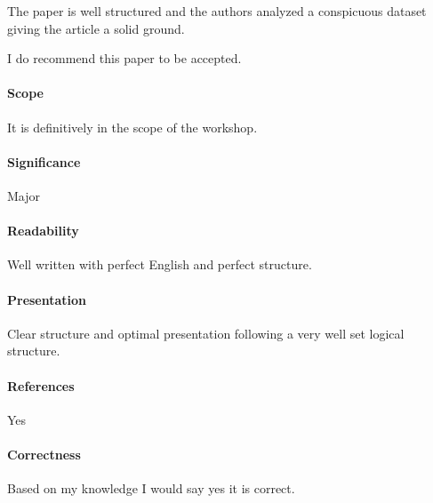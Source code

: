 \documentclass{jhps}
\begin{document}
The paper is well structured and the authors analyzed a conspicuous dataset giving the article a solid ground.

I do recommend this paper to be accepted.

\paragraph{Scope}   %

It is definitively in the scope of the workshop.

\paragraph{Significance}   %

Major

\paragraph{Readability}   %

Well written with perfect English and perfect structure.

\paragraph{Presentation}

Clear structure and optimal presentation following a very well set logical structure.

\paragraph{References}   %

Yes

\paragraph{Correctness}   %

Based on my knowledge I would say yes it is correct.
\end{document}
